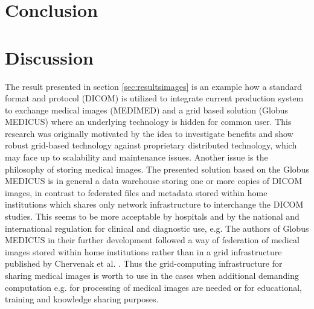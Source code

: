 \section{Conclusion}
\label{sec:conclusion}

\section{Discussion}



The result presented in section \ref{sec:resultsimages} is an example how a standard format and protocol (DICOM) is utilized to integrate current production system to exchange medical images (MEDIMED) and a grid based solution (Globus MEDICUS) where an underlying technology is hidden for common user. This research was originally motivated by the idea to investigate benefits and show robust grid-based technology against proprietary distributed technology, which may face up to scalability and maintenance issues. Another issue is the philosophy of storing medical images. The presented solution based on the Globus MEDICUS is in general a data warehouse storing one or more copies of DICOM images, in contrast to federated files and metadata stored within home institutions which shares only network infrastructure to interchange the DICOM studies. This seems to be more acceptable by hospitals and by the national and international regulation for clinical and diagnostic use, e.g. The authors of Globus MEDICUS in their further development followed a way of federation of medical images stored within home institutions rather than in a grid infrastructure published by Chervenak et al. \cite{Chervenak2012}. 
Thus the grid-computing infrastructure for sharing medical images is worth to use in the cases when additional demanding computation e.g. for processing of medical images are needed or for educational, training and knowledge sharing purposes.

